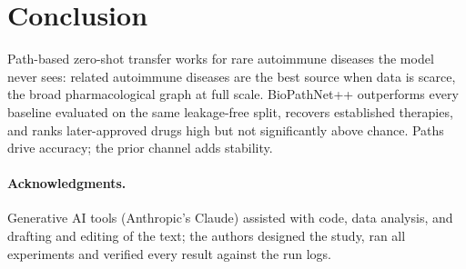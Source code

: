 \documentclass{svproc}
\newcommand{\sysname}{BioPathNet++\xspace}
\begin{document}
\section{Conclusion}
Path-based zero-shot transfer works for rare autoimmune diseases the model never sees: related autoimmune diseases are the best source when data is scarce, the broad pharmacological graph at full scale. \sysname outperforms every baseline evaluated on the same leakage-free split, recovers established therapies, and ranks later-approved drugs high but not significantly above chance. Paths drive accuracy; the prior channel adds stability.

\paragraph{Acknowledgments.} Generative AI tools (Anthropic's Claude) assisted with code, data analysis, and drafting and editing of the text; the authors designed the study, ran all experiments and verified every result against the run logs.



\end{document}
